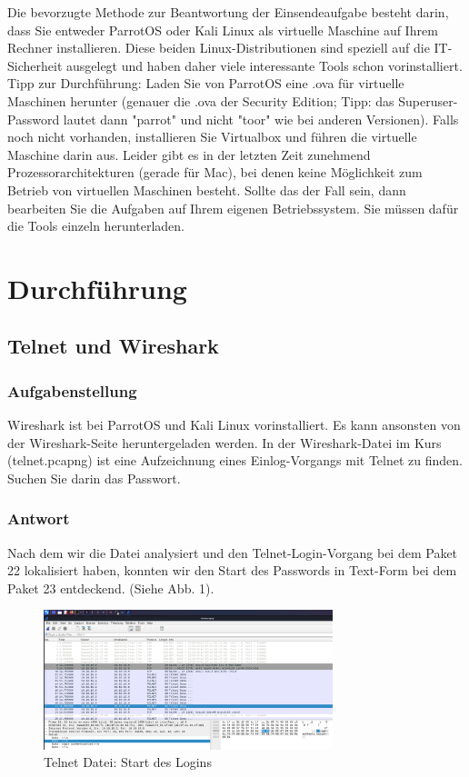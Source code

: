 \documentclass{article}
\begin{document}
Die bevorzugte Methode zur Beantwortung der Einsendeaufgabe besteht darin, dass Sie 
entweder ParrotOS oder Kali Linux als virtuelle Maschine auf Ihrem Rechner installieren. 
Diese beiden Linux-Distributionen sind speziell auf die IT-Sicherheit ausgelegt und haben 
daher viele interessante Tools schon vorinstalliert. 
Tipp zur Durchführung: Laden Sie von ParrotOS  eine .ova für virtuelle Maschinen herunter 
(genauer die .ova der Security Edition; Tipp: das Superuser-Password lautet dann "parrot" 
und nicht "toor" wie bei anderen Versionen). Falls noch nicht vorhanden, installieren Sie 
Virtualbox  und führen die virtuelle Maschine darin aus.
Leider gibt es in der letzten Zeit zunehmend Prozessorarchitekturen (gerade für Mac), bei 
denen keine Möglichkeit zum Betrieb von virtuellen Maschinen besteht. Sollte das der Fall 
sein, dann bearbeiten Sie die Aufgaben auf Ihrem eigenen Betriebssystem. Sie müssen dafür 
die Tools einzeln herunterladen.

\newpage

\section{Durchführung}

\subsection{Telnet und Wireshark}

\subsubsection*{Aufgabenstellung}

Wireshark ist bei ParrotOS und Kali Linux vorinstalliert. Es kann ansonsten von der 
Wireshark-Seite heruntergeladen werden. In der Wireshark-Datei im Kurs (telnet.pcapng) ist 
eine Aufzeichnung eines Einlog-Vorgangs mit Telnet zu finden. Suchen Sie darin das 
Passwort.

\subsubsection*{Antwort}

Nach dem wir die Datei analysiert und den Telnet-Login-Vorgang bei dem Paket 
22 lokalisiert haben, konnten wir den Start des Passwords in Text-Form 
bei dem Paket 23 entdeckend. (Siehe Abb. 1).

\begin{figure}[H]
	\includegraphics[width=0.75\textwidth]{images/01}
	\centering
	\caption{Telnet Datei: Start des Logins}
\end{figure}
\end{document}
